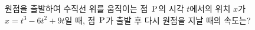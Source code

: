 원점을 출발하여 수직선 위를 움직이는 점~$\mathrm{P}$의 시각 $t$에서의 위치 $x$가 $x=t^3-6t^2+9t$일 때, 점~$\mathrm{P}$가 출발 후 다시 원점을 지날 때의 속도는?
